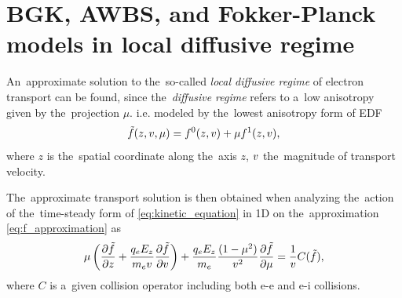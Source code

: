 \section{BGK, AWBS, and Fokker-Planck models in local diffusive regime}
\label{sec:DiffusiveKinetics}


An~approximate solution to the~so-called \textit{local diffusive regime} 
of electron transport can be found, since the~\textit{diffusive regime}
refers to a~low anisotropy given by the~projection $\mu$. i.e.
modeled by the~lowest anisotropy form of EDF  
\begin{equation}
  \tilde{f}(z, v, \mu) = f^0(z, v) + \mu f^1(z, v),
  \label{eq:f_approximation}
\end{equation}
where $z$ is the~spatial coordinate along the~axis $z$, $v$ 
the~magnitude of transport velocity. 


The~approximate transport solution is then obtained when analyzing 
the~action of the~time-steady form of \eqref{eq:kinetic_equation} in 1D 
on the~approximation \eqref{eq:f_approximation} as
\begin{equation}
  \mu\left(\frac{\partial{\tilde{f}}}{\partial{z}} 
  + \frac{q_eE_z}{m_ev}\frac{\partial{\tilde{f}}}{\partial{v}}\right) 
  + \frac{q_eE_z}{m_e}\frac{(1-\mu^2)}{v^2}\frac{\partial{\tilde{f}}}{\partial{\mu}}
  = \frac{1}{v}C(\tilde{f}) ,
  \label{eq:1D_kinetic_equation}
\end{equation}
where $C$ is a~given collision operator including both e-e and e-i collisions.

